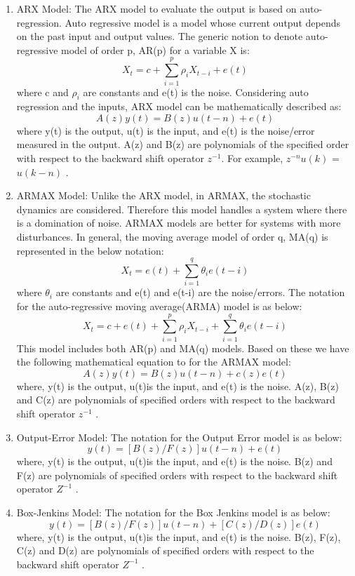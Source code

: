 \documentclass[article,type=msc,colorback,12pt,accentcolor=tud8b,table]{tudthesis}
\begin{document}
	\begin{enumerate}
		\item{ARX Model:} The ARX model to evaluate the output is based on auto-regression. Auto regressive model is a model whose current output depends on the past input and output values. The generic notion to denote auto-regressive model of order p, AR(p) for a variable X is: $$ X_t = c + \sum_{i=1}^{p} \rho_i X_{t-i} + e(t) $$ where c and $ \rho_i $ are constants and e(t) is the noise. Considering auto regression and the inputs, ARX model can be mathematically described as: $$ A(z) y(t) = B(z) u(t-n) + e(t) $$ where y(t) is the output, u(t) is the input, and e(t) is the noise/error measured in the output. A(z) and B(z) are polynomials of the specified order with respect to the backward shift operator $z^{-1}$. For example, $z^{-n}  u(k)$ = $u(k-n)$ \cite{ljung1999system}.
		
	\item{ARMAX Model:} Unlike the ARX model, in ARMAX, the stochastic dynamics are considered. Therefore this model handles a system where there is a domination of noise. ARMAX models are better for systems with more disturbances. In general, the moving average model of order q, MA(q) is represented in the below notation: $$ X_t =  e(t) + \sum_{i=1}^{q} \theta_i e(t-i) $$ where $ \theta_i $ are constants and e(t) and e(t-i) are the noise/errors. The notation for the auto-regressive moving average(ARMA) model is as below: $$ X_t = c + e(t) + \sum_{i=1}^{p} \rho_i X_{t-i} + \sum_{i=1}^{q} \theta_i e(t-i) $$ This model includes both AR(p) and MA(q) models. Based on these we have the following mathematical equation to for the ARMAX model: $$ A(z) y(t) = B(z) u(t-n) + c(z) e(t) $$ where, y(t) is the output, u(t)is the input, and e(t) is the noise. A(z), B(z) and C(z) are polynomials of specified orders with respect to the backward shift operator $z^{-1}$ \cite{ljung1999system}. 
	
	\item{Output-Error Model:} 
		The notation for the Output Error model is as below: $$ y(t) = [B(z)/F(z)] u(t-n) + e(t) $$ where, y(t) is the output, u(t)is the input, and e(t) is the noise. B(z) and F(z) are polynomials of specified orders with respect to the backward shift operator $Z^{-1}$ \cite{ljung1999system}.
	
	\item{Box-Jenkins Model:} 	
		 The notation for the Box Jenkins model is as below: $$ y(t) = [B(z)/F(z)] u(t-n) + [C(z)/D(z)] e(t) $$ where, y(t) is the output, u(t)is the input, and e(t) is the noise. B(z), F(z), C(z) and D(z) are polynomials of specified orders with respect to the backward shift operator $Z^{-1}$ \cite{box2015time}.	 
		 
	\end{enumerate}
	
\end{document}
